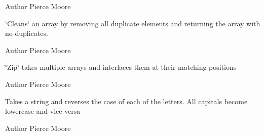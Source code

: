 \begin{DoxyAuthor}{Author}
Pierce Moore
\end{DoxyAuthor}
\char`\"{}\-Cleans\char`\"{} an array by removing all duplicate elements and returning the array with no duplicates.

\begin{DoxyAuthor}{Author}
Pierce Moore
\end{DoxyAuthor}
\char`\"{}\-Zip\char`\"{} takes multiple arrays and interlaces them at their matching positions

\begin{DoxyAuthor}{Author}
Pierce Moore
\end{DoxyAuthor}
Takes a string and reverses the case of each of the letters. All capitals become lowercase and vice-\/versa

\begin{DoxyAuthor}{Author}
Pierce Moore 
\end{DoxyAuthor}
